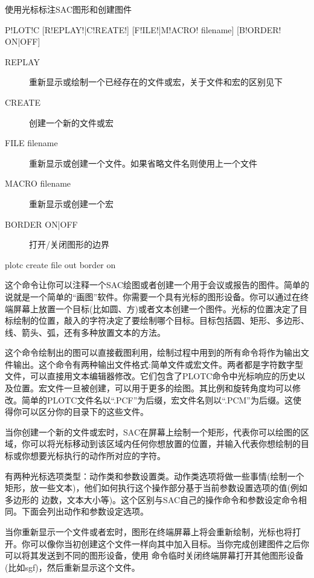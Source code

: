\label{cmd:plotc}

使用光标标注SAC图形和创建图件

\begin{SACSTX}
P!LOT!C [R!EPLAY!|C!REATE!] [F!ILE!|M!ACRO! filename] [B!ORDER! ON|OFF]
\end{SACSTX}

\begin{description}
\item [REPLAY] 重新显示或绘制一个已经存在的文件或宏，关于文件和宏的区别见下
\item [CREATE] 创建一个新的文件或宏
\item [FILE filename] 重新显示或创建一个文件。如果省略文件名则使用上一个文件
\item [MACRO filename] 重新显示或创建一个宏
\item [BORDER ON|OFF] 打开/关闭图形的边界
\end{description}

\begin{SACDFT}
plotc create file out border on
\end{SACDFT}

这个命令让你可以注释一个SAC绘图或者创建一个用于会议或报告的图件。简单的说就是一个简单的``画图''软件。你需要一个具有光标的图形设备。你可以通过在终端屏幕上放置一个目标(比如圆、方)或者文本创建一个图件。光标的位置决定了目标绘制的位置，敲入的字符决定了要绘制哪个目标。目标包括圆、矩形、多边形、线、箭头、弧，还有多种放置文本的方法。

这个命令绘制出的图可以直接截图利用，绘制过程中用到的所有命令将作为输出文件输出。这个命令有两种输出文件格式:简单文件或宏文件。两者都是字符数字型文件，可以直接用文本编辑器修改。它们包含了PLOTC命令中光标响应的历史以及位置。宏文件一旦被创建，可以用于更多的绘图。其比例和旋转角度均可以修改。简单的PLOTC文件名以``.PCF''为后缀，宏文件名则以``.PCM''为后缀。这使得你可以区分你的目录下的这些文件。

当你创建一个新的文件或宏时，SAC在屏幕上绘制一个矩形，代表你可以绘图的区域，你可以将光标移动到该区域内任何你想放置的位置，并输入代表你想绘制的目标或你想要光标执行的动作所对应的字符。

有两种光标选项类型：动作类和参数设置类。动作类选项将做一些事情(绘制一个矩形，放一些文本)，他们如何执行这个操作部分基于当前参数设置选项的值(例如多边形的	边数，文本大小等)。这个区别与SAC自己的操作命令和参数设定命令相同。下面会列出动作和参数设定选项。

当你重新显示一个文件或者宏时，图形在终端屏幕上将会重新绘制，光标也将打开。你可以像你当初创建这个文件一样向其中加入目标。当你完成创建图件之后你可以将其发送到不同的图形设备，使用  命令临时关闭终端屏幕打开其他图形设备(比如sgf)，然后重新显示这个文件。

